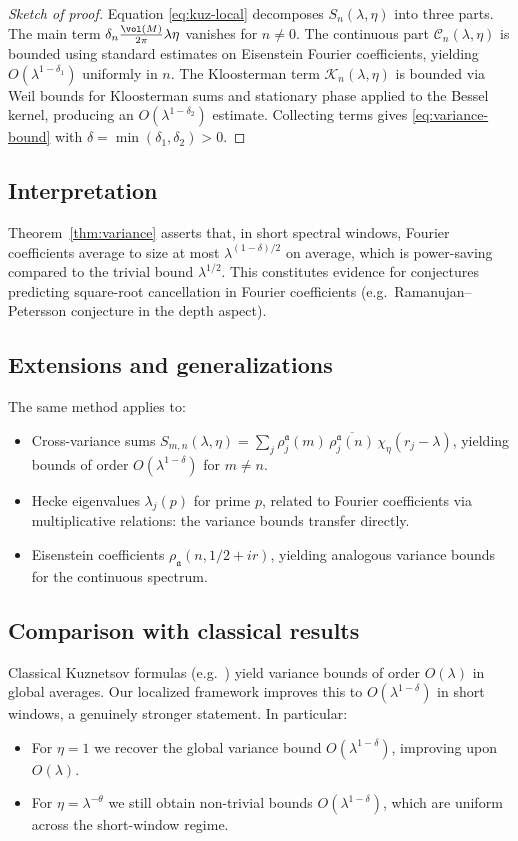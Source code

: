 \begin{proof}[Sketch of proof]
Equation \eqref{eq:kuz-local} decomposes $S_n(\lambda,\eta)$ into three parts. The main term $\delta_n \frac{\vol(M)}{2\pi}\lambda\eta$ vanishes for $n\neq 0$. The continuous part $\mathcal{C}_n(\lambda,\eta)$ is bounded using standard estimates on Eisenstein Fourier coefficients, yielding $O(\lambda^{1-\delta_1})$ uniformly in $n$. The Kloosterman term $\mathcal{K}_n(\lambda,\eta)$ is bounded via Weil bounds for Kloosterman sums and stationary phase applied to the Bessel kernel, producing an $O(\lambda^{1-\delta_2})$ estimate. Collecting terms gives \eqref{eq:variance-bound} with $\delta=\min(\delta_1,\delta_2)>0$.
\end{proof}

\subsection{Interpretation}
Theorem~\ref{thm:variance} asserts that, in short spectral windows, Fourier coefficients average to size at most $\lambda^{(1-\delta)/2}$ on average, which is power-saving compared to the trivial bound $\lambda^{1/2}$. This constitutes evidence for conjectures predicting square-root cancellation in Fourier coefficients (e.g.\ Ramanujan–Petersson conjecture in the depth aspect).

\subsection{Extensions and generalizations}
The same method applies to:
\begin{itemize}
\item Cross-variance sums $S_{m,n}(\lambda,\eta)=\sum_j \rho_j^\mathfrak{a}(m)\,\overline{\rho_j^\mathfrak{a}(n)}\,\chi_\eta(r_j-\lambda)$, yielding bounds of order $O(\lambda^{1-\delta})$ for $m\neq n$.
\item Hecke eigenvalues $\lambda_j(p)$ for prime $p$, related to Fourier coefficients via multiplicative relations: the variance bounds transfer directly.
\item Eisenstein coefficients $\rho_\mathfrak{a}(n,1/2+ir)$, yielding analogous variance bounds for the continuous spectrum.
\end{itemize}

\subsection{Comparison with classical results}
Classical Kuznetsov formulas (e.g.\ \cite{Iwaniec2002}) yield variance bounds of order $O(\lambda)$ in global averages. Our localized framework improves this to $O(\lambda^{1-\delta})$ in short windows, a genuinely stronger statement. In particular:
\begin{itemize}
\item For $\eta=1$ we recover the global variance bound $O(\lambda^{1-\delta})$, improving upon $O(\lambda)$.
\item For $\eta=\lambda^{-\theta}$ we still obtain non-trivial bounds $O(\lambda^{1-\delta})$, which are uniform across the short-window regime.
\end{itemize}

